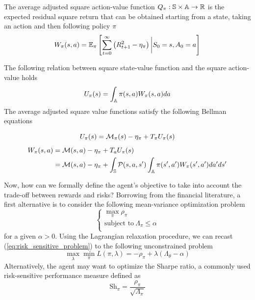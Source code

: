 \begin{definition}
	The average adjusted square action-value function $Q_\pi : \S \times \A \to 
	\R$ is the expected residual square return that can be obtained starting from a
	state, taking an action and then following policy $\pi$
	\begin{equation}
		W_\pi(s, a) = \E[\pi]{\sum^{\infty}_{t=0} \left(R_{t+1}^2 -
			\eta_\pi\right) \bigg| S_0 = s, A_0 = a}
	\end{equation}
\end{definition}
The following relation between square state-value function and the square action-value holds
\begin{equation}\label{eq:UW_equality}
	U_\pi(s) = \int_\A \pi(s,a) W_\pi(s,a) da
\end{equation}
The average adjusted square value functions satisfy the following Bellman equations
\begin{proposition}
	\begin{equation}
		U_\pi(s) = \calM_\pi(s) - \eta_\pi + T_\pi U_\pi(s)
	\end{equation}
	\begin{equation}
		\begin{split}
			W_\pi(s,a) &= \calM(s,a) - \eta_\pi + T_a U_\pi(s)\\
			&= \calM(s,a) - \eta_\pi + \int_{\S} \calP(s,a,s') \int_{\A} \pi(s',a') W_\pi(s',a') da' ds'
		\end{split}
	\end{equation}
\end{proposition}
Now, how can we formally define the agent's objective to take into account the trade-off between rewards and risks? Borrowing from the financial literature, a first alternative is to consider the following mean-variance optimization problem
\begin{equation}\label{eq:risk_sensitive_problem}
	\begin{cases}
		\max_\pi \rho_\pi\\
		\text{subject to}\ \Lambda_\pi \leq \alpha\\
	\end{cases}
\end{equation}
for a given $\alpha > 0$. Using the Lagrangian relaxation procedure, we can 
recast (\ref{eq:risk_sensitive_problem}) to the following unconstrained problem
\begin{equation}
	\max_\lambda \min_\pi L(\pi, \lambda) = - \rho_\pi + \lambda 
	(\Lambda_\theta - \alpha)
\end{equation}
Alternatively, the agent may want to optimize the Sharpe ratio, a commonly used risk-sensitive performance measure defined as
\begin{equation}
	\text{Sh}_\pi = \frac{\rho_\pi}{\sqrt{\Lambda_\pi}} 
\end{equation}


